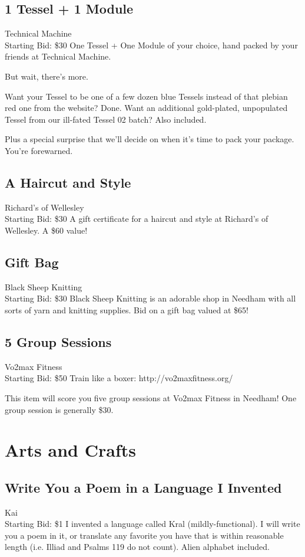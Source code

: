\documentclass[11pt]{article}
\begin{document}
\subsection{1 Tessel + 1 Module}
Technical Machine
\\
Starting Bid: \$30
\newline
One Tessel + One Module of your choice, hand packed by your friends at Technical Machine.

But wait, there's more.

Want your Tessel to be one of a few dozen blue Tessels instead of that plebian red one from the website? Done. Want an additional gold-plated, unpopulated Tessel from our ill-fated Tessel 02 batch? Also included.

Plus a special surprise that we'll decide on when it's time to pack your package. You're forewarned.
\subsection{A Haircut and Style}
Richard's of Wellesley
\\
Starting Bid: \$30
\newline
A gift certificate for a haircut and style at Richard's of Wellesley. A \$60 value!
\subsection{Gift Bag}
Black Sheep Knitting
\\
Starting Bid: \$30
\newline
Black Sheep Knitting is an adorable shop in Needham with all sorts of yarn and knitting supplies. Bid on a gift bag valued at \$65!
\subsection{5 Group Sessions}
Vo2max Fitness
\\
Starting Bid: \$50
\newline
Train like a boxer: http://vo2maxfitness.org/

This item will score you five group sessions at Vo2max Fitness in Needham! One group session is generally \$30.
\section{Arts and Crafts}
\subsection{Write You a Poem in a Language I Invented}
Kai
\\
Starting Bid: \$1
\newline
I invented a language called Kral (mildly-functional). I will write you a poem in it, or translate any favorite you have that is within reasonable length (i.e. Illiad and Psalms 119 do not count). Alien alphabet included.
\end{document}

